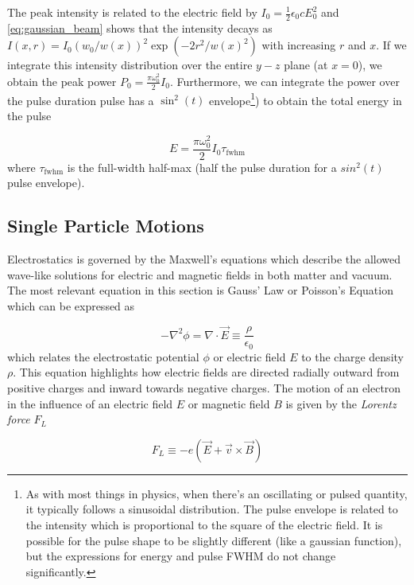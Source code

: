 The peak intensity is related to the electric field by $I_0 = \frac{1}{2} \epsilon_0 c E_0^2$ and \cref{eq:gaussian_beam} shows that the intensity decays as $I(x, r) = I_0 (w_0 / w(x))^2 \exp(-2 r^2 / w(x)^2)$ with increasing $r$ and $x$. If we integrate this intensity distribution over the entire $y-z$ plane (at $x=0$), we obtain the peak power $P_0 = \frac{\pi \omega_0^2}{2} I_0$. Furthermore, we can integrate the power over the pulse duration pulse has a $\sin^2(t)$ envelope\footnote{As with most things in physics, when there's an oscillating or pulsed quantity, it typically follows a sinusoidal distribution. The pulse envelope is related to the intensity which is proportional to the square of the electric field. It is possible for the pulse shape to be slightly different (like a gaussian function), but the expressions for energy and pulse FWHM do not change significantly.}) to obtain the total energy in the pulse 

\begin{equation}
	E = \frac{\pi \omega_0^2}{2} I_0 \tau_\text{fwhm} \label{eq:gaussian_beam_energy}
\end{equation}
where $\tau_\text{fwhm}$ is the full-width half-max (half the pulse duration for a $sin^2(t)$ pulse envelope). 

\subsection{Single Particle Motions}

Electrostatics is governed by the Maxwell's equations which describe the allowed wave-like solutions for electric and magnetic fields in both matter and vacuum. The most relevant equation in this section is Gauss' Law or Poisson's Equation which can be expressed as 

\begin{equation}
	- \nabla^2 \phi = \nabla \cdot \vec{E} \equiv \frac{\rho}{\epsilon_0} \label{eq:poisson}
\end{equation}
which relates the electrostatic potential $\phi$ or electric field $E$ to the charge density $\rho$. This equation highlights how electric fields are directed radially outward from positive charges and inward towards negative charges. The motion of an electron in the influence of an electric field $E$ or magnetic field $B$ is given by the \emph{Lorentz force} $F_L$

\begin{equation}
	F_L \equiv -e (\vec{E} + \vec{v} \times \vec{B}) \label{eq:lorentz}
\end{equation}

